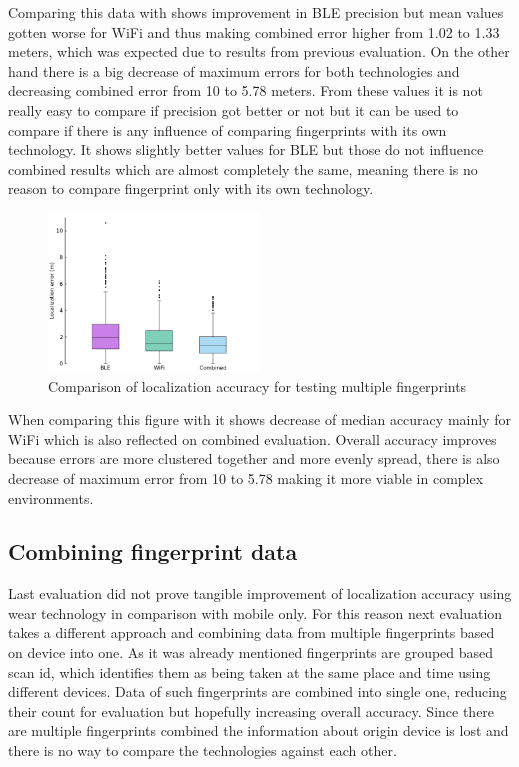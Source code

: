 Comparing this data with  shows improvement in BLE precision but mean values gotten worse for WiFi and thus making combined error higher from 1.02 to 1.33 meters, which was expected due to results from previous evaluation. On the other hand there is a big decrease of maximum errors for both technologies and decreasing combined error from 10 to 5.78 meters. From these values it is not really easy to compare if precision got better or not but it can be used to compare if there is any influence of comparing fingerprints with its own technology. It shows slightly better values for BLE but those do not influence combined results which are almost completely the same, meaning there is no reason to compare fingerprint only with its own technology.

\begin{figure}[h!]
	\begin{centering}
		\includegraphics[width=0.5\textwidth]{img/wknn_errors_multiple}
		\par\end{centering}
	\caption{Comparison of localization accuracy for testing multiple fingerprints}
	\label{fig07c06}
\end{figure}

When comparing this figure with  it shows decrease of median accuracy mainly for WiFi which is also reflected on combined evaluation. Overall accuracy improves because errors are more clustered together and more evenly spread, there is also decrease of maximum error from 10 to 5.78 making it more viable in complex environments.

\subsection{Combining fingerprint data}\label{sec:CombiningFingerprintData}
Last evaluation did not prove tangible improvement of localization accuracy using wear technology in comparison with mobile only. For this reason next evaluation takes a different approach and combining data from multiple fingerprints based on device into one. As it was already mentioned fingerprints are grouped based scan id, which identifies them as being taken at the same place and time using different devices. Data of such fingerprints are combined into single one, reducing their count for evaluation but hopefully increasing overall accuracy. Since there are multiple fingerprints combined the information about origin device is lost and there is no way to compare the technologies against each other.

